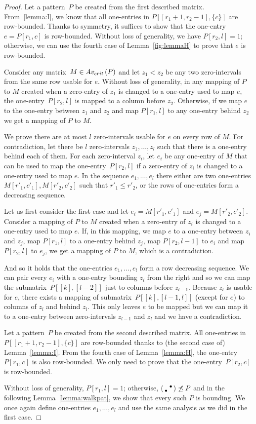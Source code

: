 \begin{proof}
Let a pattern~$P$ be created from the first described matrix. From~\ref{lemma:I}, we know that all one-entries in $P[[r_1+1,r_2-1],\{c\}]$ are row-bounded. Thanks to symmetry, it suffices to show that the one-entry~$e=P[r_1,c]$ is row-bounded. Without loss of generality, we have $P[r_2,l]=1$; otherwise, we can use the fourth case of Lemma~\ref{fig:lemmaH} to prove that $e$ is row-bounded.

Consider any matrix~$M\in Av_{crit}\left(P\right)$ and let $z_1<z_2$ be any two zero-intervals from the same row usable for $e$. Without loss of generality, in any mapping of $P$ to $M$ created when a zero-entry of $z_1$ is changed to a one-entry used to map $e$, the one-entry~$P[r_2,l]$ is mapped to a column before $z_2$. Otherwise, if we map $e$ to the one-entry between $z_1$ and $z_2$ and map $P[r_1,l]$ to any one-entry behind $z_2$ we get a mapping of $P$ to $M$.

We prove there are at most $l$ zero-intervals usable for $e$ on every row of $M$. For contradiction, let there be $l$ zero-intervals $z_1,\dots,z_l$ such that there is a one-entry behind each of them. For each zero-interval $z_i$, let $e_i$ be any one-entry of $M$ that can be used to map the one-entry~$P[r_2,l]$ if a zero-entry of $z_i$ is changed to a one-entry used to map $e$. In the sequence $e_1,\dots,e_l$ there either are two one-entries $M[r'_1,c'_1],M[r'_2,c'_2]$ such that $r'_1\leq r'_2$, or the rows of one-entries form a decreasing sequence.

Let us first consider the first case and let $e_i=M[r'_1,c'_1]$ and $e_j=M[r'_2,c'_2]$. Consider a mapping of $P$ to $M$ created when a zero-entry of $z_i$ is changed to a one-entry used to map $e$. If, in this mapping, we map $e$ to a one-entry between $z_i$ and $z_j$, map $P[r_1,l]$ to a one-entry behind $z_j$, map $P[r_2,l-1]$ to $e_i$ and map $P[r_2,l]$ to $e_j$, we get a mapping of $P$ to $M$, which is a contradiction.

And so it holds that the one-entries $e_1,\dots,e_l$ form a row decreasing sequence. We can pair every $e_i$ with a one-entry bounding $z_i$ from the right and so we can map the submatrix~$P[[k],[l-2]]$ just to columns before $z_{l-1}$. Because $z_l$ is usable for $e$, there exists a mapping of submatrix~$P[[k],[l-1,l]]$ (except for $e$) to columns of $z_l$ and behind $z_l$. This only leaves $e$ to be mapped but we can map it to a one-entry between zero-intervals $z_{l-1}$ and $z_l$ and we have a contradiction.

Let a pattern~$P$ be created from the second described matrix. All one-entries in $P[[r_1+1,r_2-1],\{c\}]$ are row-bounded thanks to (the second case of) Lemma~\ref{lemma:I}. From the fourth case of Lemma~\ref{lemma:H}, the one-entry~$P[r_1,c]$ is also row-bounded. We only need to prove that the one-entry~$P[r_2,c]$ is row-bounded.

Without loss of generality, $P[r_1,l]=1$; otherwise, $\left(\begin{smallmatrix} &\bullet\\\bullet& \end{smallmatrix}\right)\not\preceq P$ and in the following Lemma~\ref{lemma:walkpat}, we show that every such $P$ is bounding. We once again define one-entries $e_1,\dots,e_l$ and use the same analysis as we did in the first case.
\end{proof}

